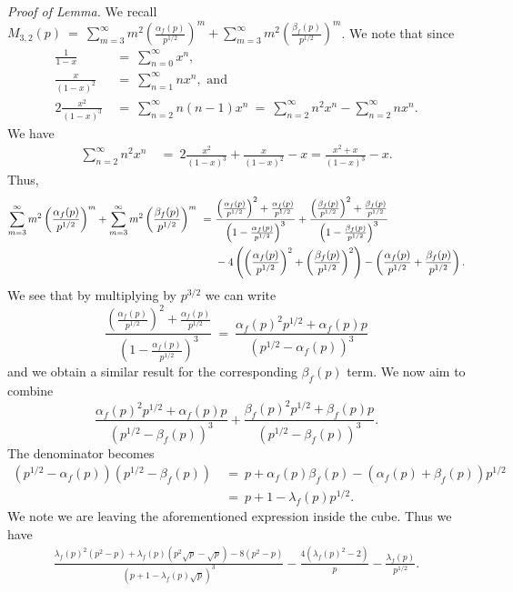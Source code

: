 \documentclass[11pt, reqno]{amsart}
\theoremstyle{definition}
\theoremstyle{remark}
\numberwithin{equation}{section}
\begin{document}
\noindent \textit{Proof of Lemma.} We recall $M_{3,2}(p)\ =\ \sum_{m=3}^{\infty}m^2\left(\frac{\alpha_f(p)}{p^{1/2}}\right)^m+\sum_{m=3}^{\infty}m^2\left(\frac{\beta_f(p)}{p^{1/2}}\right)^m$. We note that since \begin{align*}
    \frac{1}{1-x}\ &=\ \sum_{n=0}^{\infty}x^n, \\
   \frac{x}{(1-x)^2}\ &=\ \sum_{n=1}^{\infty}nx^n, \text{ and }\\ 2\frac{x^2}{(1-x)^3}\ &=\ \sum_{n=2}^{\infty }n(n-1)x^{n}\ =\ \sum_{n=2}^{\infty }n^2x^{n}-\sum_{n=2}^{\infty }nx^{n}.
\end{align*} We have
 \begin{align}
\sum_{n=2}^{\infty}n^2x^n\ &=\ 2\frac{x^2}{(1-x)^3}+\frac{x}{(1-x)^2}-x =\frac{x^2+x}{(1-x)^3}-x.
 \end{align}
Thus,
\begin{align}
 \sum_{m=3}^{\infty}m^2\left(\frac{\alpha_f(p)}{p^{1/2}}\right)^m+\sum_{m=3}^{\infty}m^2\left(\frac{\beta_f(p)}{p^{1/2}}\right)^m \ = \ &\frac{\left(\frac{\alpha_f(p)}{p^{1/2}}\right)^2+\frac{\alpha_f(p)}{p^{1/2}}}{\left(1- \frac{\alpha_f(p)}{p^{1/2}}\right)^3}+\frac{\left(\frac{\beta_f(p)}{p^{1/2}}\right)^2+\frac{\beta_f(p)}{p^{1/2}}}{\left(1- \frac{\beta_f(p)}{p^{1/2}}\right)^3} \notag \\
    &-4\left(\left(\frac{\alpha_f(p)}{p^{1/2}}\right)^2+\left(\frac{\beta_f(p)}{p^{1/2}}\right)^2\right)-\left(\frac{\alpha_f(p)}{p^{1/2}}+\frac{\beta_f(p)}{p^{1/2}}\right) .   
\end{align}
We see that by multiplying by $p^{3/2}$ we can write 
$$\frac{\left(\frac{\alpha_f(p)}{p^{1/2}}\right)^2+\frac{\alpha_f(p)}{p^{1/2}}}{\left(1- \frac{\alpha_f(p)}{p^{1/2}}\right)^3}\ =\ \frac{\alpha_f(p)^2p^{1/2}+\alpha_f(p)p}{(p^{1/2}-\alpha_f(p))^3}$$
and we obtain a similar result for the corresponding $\beta_f(p)$ term. We now aim to combine
\begin{equation}
    \frac{\alpha_f(p)^2p^{1/2}+\alpha_f(p)p}{(p^{1/2}-\beta_f(p))^3}+\frac{\beta_f(p)^2p^{1/2}+\beta_f(p)p}{(p^{1/2}-\beta_f(p))^3}.
\end{equation}
The denominator becomes 
\begin{align*}
    (p^{1/2}-\alpha_f(p))(p^{1/2}-\beta_f(p))\ &= \ p+\alpha_f(p)\beta_f(p)-(\alpha_f(p)+\beta_f(p))p^{1/2}\\
   \ &= \ p+1-\lambda_f(p)p^{1/2}.
\end{align*}
We note we are leaving the aforementioned expression inside the cube. Thus we have
\begin{align} \label{eq:S1 second}
  \frac{\lambda_f(p)^2(p^2-p)+\lambda_f(p)(p^2\sqrt{p}-\sqrt{p})-8(p^2-p)}{(p+1-\lambda_f(p)\sqrt{p})^3}-\frac{4(\lambda_f(p)^2-2)}{p}-\frac{\lambda_f(p)}{p^{1/2}}.
\end{align}
\end{document}
